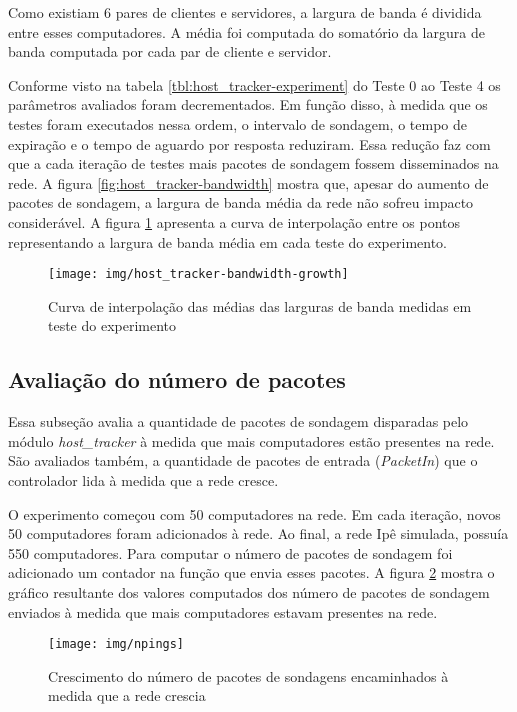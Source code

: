 Como existiam 6 pares de clientes e servidores, a largura de banda é
dividida entre esses computadores.
A média foi computada do somatório da largura de banda computada por cada
par de cliente e servidor.

Conforme visto na tabela \ref{tbl:host_tracker-experiment} do Teste 0 ao
Teste 4 os parâmetros avaliados foram decrementados.
Em função disso, à medida que os testes foram executados nessa ordem,
o intervalo de sondagem, o tempo de expiração e o tempo de aguardo por
resposta reduziram.
Essa redução faz com que a cada iteração de testes mais pacotes de sondagem
fossem disseminados na rede.
A figura \ref{fig:host_tracker-bandwidth} mostra que, apesar do aumento de
pacotes de sondagem, a largura de banda média da rede não sofreu impacto
considerável.
A figura \ref{fig:host_tracker-bandwidth-growth} apresenta a curva de
interpolação entre os pontos representando a largura de banda média em cada
teste do experimento.

\begin{figure}[!htb]
    \centering
    \label{fig:host_tracker-bandwidth-growth}
    \texttt{[image: img/host\_tracker-bandwidth-growth]}
    \caption{Curva de interpolação das médias das larguras de banda medidas
    em teste do experimento}
\end{figure}

\subsection{Avaliação do número de pacotes}

Essa subseção avalia a quantidade de pacotes de sondagem disparadas pelo
módulo \emph{host\_tracker} à medida que mais computadores estão presentes
na rede.
São avaliados também, a quantidade de pacotes de entrada (\emph{PacketIn})
que o controlador lida à medida que a rede cresce.

O experimento começou com 50 computadores na rede.
Em cada iteração, novos 50 computadores foram adicionados à rede.
Ao final, a rede Ipê simulada, possuía 550 computadores.
Para computar o número de pacotes de sondagem foi adicionado um contador
na função que envia esses pacotes.
A figura \ref{fig:npings} mostra o gráfico resultante dos valores computados
dos número de pacotes de sondagem enviados à medida que mais computadores
estavam presentes na rede.

\begin{figure}[!htb]
    \centering
    \label{fig:npings}
    \texttt{[image: img/npings]}
    \caption{Crescimento do número de pacotes de sondagens encaminhados
        à medida que a rede crescia}
\end{figure}

